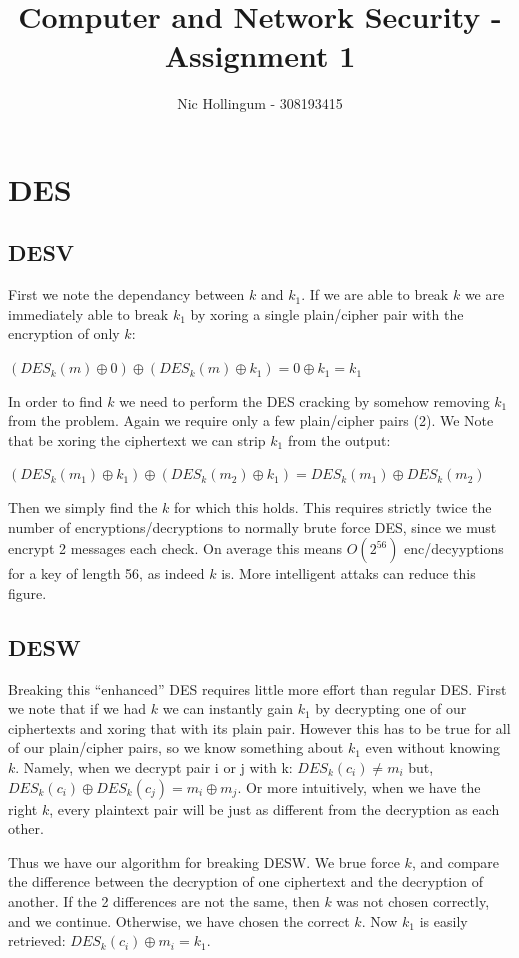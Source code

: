 \documentclass{article}
\author{Nic Hollingum - 308193415}
\title{Computer and Network Security - Assignment 1}
\begin{document}
\maketitle

\section{DES}
\subsection{DESV}
First we note the dependancy between $k$ and $k_1$.
If we are able to break $k$ we are immediately able to break $k_1$ by xoring a single plain/cipher pair with the encryption of only $k$:

$(DES_k (m) \oplus 0) \oplus (DES_k (m) \oplus k_1) = 0 \oplus k_1 = k_1$

In order to find $k$ we need to perform the DES cracking by somehow removing $k_1$ from the problem.
Again we require only a few plain/cipher pairs (2).
We Note that be xoring the ciphertext we can strip $k_1$ from the output:

$(DES_k (m_1) \oplus k_1) \oplus (DES_k (m_2) \oplus k_1) = DES_k (m_1) \oplus DES_k (m_2)$

Then we simply find the $k$ for which this holds.
This requires strictly twice the number of encryptions/decryptions to normally brute force DES, since we must encrypt 2 messages each check.
On average this means $O(2^{56})$ enc/decyyptions for a key of length 56, as indeed $k$ is.
More intelligent attaks can reduce this figure.

\subsection{DESW}
Breaking this ``enhanced'' DES requires little more effort than regular DES.
First we note that if we had $k$ we can instantly gain $k_1$ by decrypting one of our ciphertexts and xoring that with its plain pair.
However this has to be true for all of our plain/cipher pairs, so we know something about $k_1$ even without knowing $k$.
Namely, when we decrypt pair i or j with k: $DES_k (c_i) \ne m_i$ but, $DES_k (c_i) \oplus DES_k(c_j) = m_i \oplus m_j$.
Or more intuitively, when we have the right $k$, every plaintext pair will be just as different from the decryption as each other.

Thus we have our algorithm for breaking DESW.
We brue force $k$, and compare the difference between the decryption of one ciphertext and the decryption of another.
If the 2 differences are not the same, then $k$ was not chosen correctly, and we continue.
Otherwise, we have chosen the correct $k$.
Now $k_1$ is easily retrieved: $DES_k (c_i) \oplus m_i = k_1$.
\end{document}

